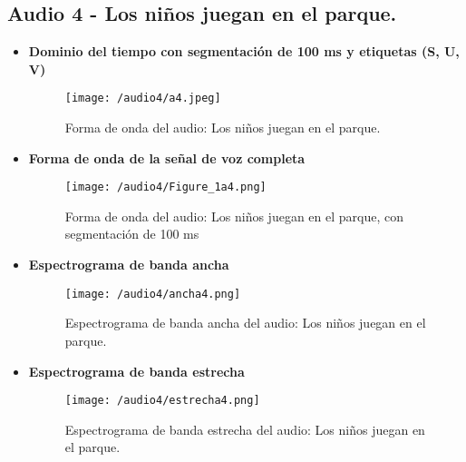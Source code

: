 \documentclass{report}
\begin{document}
\subsection{Audio 4 - Los niños juegan en el parque.}
\begin{itemize}
    \item \textbf{Dominio del tiempo con segmentación de 100 ms y etiquetas (S, U, V)}
    \begin{figure}[h]
        \centering
        \texttt{[image: /audio4/a4.jpeg]}
        \caption{Forma de onda del audio: Los niños juegan en el parque.}
        \label{fig:forma_onda_audio4div}
    \end{figure}
    \item \textbf{Forma de onda de la señal de voz completa}
    \begin{figure}[h]
        \centering
        \texttt{[image: /audio4/Figure\_1a4.png]}
        \caption{Forma de onda del audio: Los niños juegan en el parque, con segmentación de 100 ms}
        \label{fig:forma de onda_audio4}
    \end{figure}
    \newpage
    \item \textbf{Espectrograma de banda ancha}
    \begin{figure}[h]
        \centering
        \texttt{[image: /audio4/ancha4.png]}
        \caption{Espectrograma de banda ancha del audio: Los niños juegan en el parque.}
        \label{fig:espectograma banda ancha audio4}
    \end{figure}
    \item \textbf{Espectrograma de banda estrecha}
    \begin{figure}[h]
        \centering
        \texttt{[image: /audio4/estrecha4.png]}
        \caption{Espectrograma de banda estrecha del audio: Los niños juegan en el parque.}
        \label{fig:espectograma banda estrecha audio4}
    \end{figure}
\end{itemize}

\newpage
\end{document}
